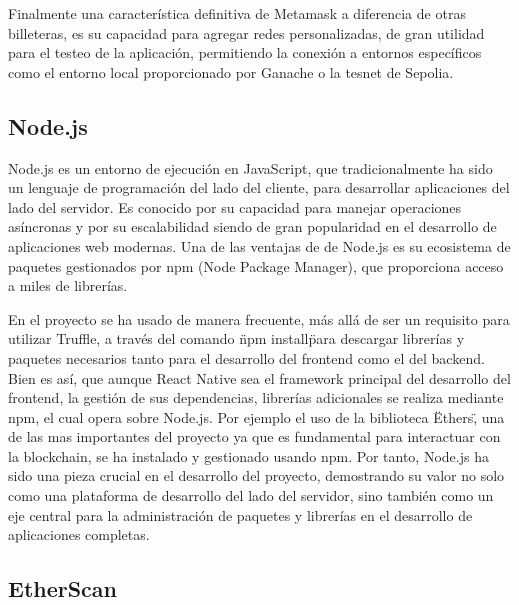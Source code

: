 Finalmente una característica definitiva de Metamask a diferencia de otras billeteras, es su capacidad para agregar redes personalizadas, de gran utilidad para el testeo de la aplicación, permitiendo la conexión a entornos específicos como el entorno local proporcionado por Ganache o la tesnet de Sepolia.


\subsection{Node.js}

Node.js es un entorno de ejecución en JavaScript, que tradicionalmente ha sido un lenguaje de programación del lado del cliente, para desarrollar aplicaciones del lado del servidor. Es conocido por su capacidad para manejar operaciones asíncronas y por su escalabilidad siendo de gran popularidad en el desarrollo de aplicaciones web modernas. Una de las ventajas de de Node.js es su ecosistema de paquetes gestionados por npm (Node Package Manager), que proporciona acceso a miles de librerías.

En el proyecto se ha usado de manera frecuente, más allá de ser un requisito para utilizar Truffle, a través del comando \"npm install\" para descargar librerías y paquetes necesarios tanto para el desarrollo del frontend como el del backend.
Bien es así, que aunque React Native sea el framework principal del desarrollo del frontend, la gestión de sus dependencias, librerías adicionales se realiza mediante npm, el cual opera sobre Node.js.
Por ejemplo el uso de la biblioteca \"Ethers\", una de las mas importantes del proyecto ya que es fundamental para interactuar con la blockchain, se ha instalado y gestionado usando npm.
Por tanto, Node.js ha sido una pieza crucial en el desarrollo del proyecto, demostrando su valor no solo como una plataforma de desarrollo del lado del servidor, sino también como un eje central para la administración de paquetes y librerías en el desarrollo de aplicaciones completas.


\subsection{EtherScan}

